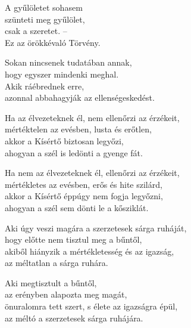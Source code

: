 \begin{dhpverse}

 A gyűlöletet sohasem\\
szünteti meg gyűlölet,\\
csak a szeretet. --\\
Ez az örökkévaló Törvény.

 Sokan nincsenek tudatában annak,\\
hogy egyszer mindenki meghal.\\
Akik ráébrednek erre,\\
azonnal abbahagyják az ellenségeskedést.

 Ha az élvezeteknek él, nem ellenőrzi az érzékeit,\\
mértéktelen az evésben, lusta és erőtlen,\\
akkor a Kísértő biztosan legyőzi,\\
ahogyan a szél is ledönti a gyenge fát.

 Ha nem az élvezeteknek él, ellenőrzi az érzékeit,\\
mértékletes az evésben, erős és hite szilárd,\\
akkor a Kísértő éppúgy nem fogja legyőzni,\\
ahogyan a szél sem dönti le a kősziklát.

 Aki úgy veszi magára a szerzetesek sárga ruháját,\\
hogy előtte nem tisztul meg a bűntől,\\
akiből hiányzik a mértékletesség és az igazság,\\
az méltatlan a sárga ruhára.

 Aki megtisztult a bűntől,\\
az erényben alapozta meg magát,\\
önuralomra tett szert, s élete az igazságra épül,\\
az méltó a szerzetesek sárga ruhájára.

\end{dhpverse}
\newpage
